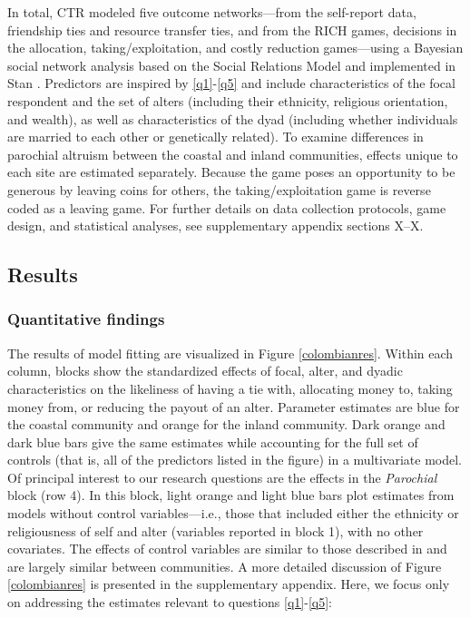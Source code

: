 \documentclass[bibauthoryear]{aa}
\begin{document}
In total, CTR modeled five outcome networks---from the self-report data, friendship ties and resource transfer ties, and from the RICH games, decisions in the allocation, taking/exploitation, and costly reduction games---using a Bayesian social network analysis based on the Social Relations Model \citep[SRM,][]{kenny1984social,  koster2019statistical} and implemented in Stan \citep{Rstan2017xx}. Predictors are inspired by \ref{q1}-\ref{q5} and include characteristics of the focal respondent and the set of alters (including their ethnicity, religious orientation, and wealth), as well as characteristics of the dyad (including whether individuals are married to each other or genetically related). To examine differences in parochial altruism between the coastal and inland communities, effects unique to each site are estimated separately. Because the game poses an opportunity to be generous by leaving coins for others, the taking/exploitation game is reverse coded as a leaving game. For further details on data collection protocols, game design, and statistical analyses, see supplementary appendix sections X--X.

\subsection{Results}
\subsubsection{Quantitative findings}
The results of model fitting are visualized in Figure \ref{colombianres}. Within each column, blocks show the standardized effects of focal, alter, and dyadic characteristics on the likeliness of having a tie with, allocating money to, taking money from, or reducing the payout of an alter. Parameter estimates are blue for the coastal community  and orange for the inland community. Dark orange and dark blue bars give the same estimates while accounting for the full set of controls (that is, all of the predictors listed in the figure) in a multivariate model. %
Of principal interest to our research questions  are the effects in the \emph{Parochial} block (row 4). In this block, light orange and light blue bars plot estimates from models without control variables---i.e., those that included either the ethnicity or religiousness of self and alter (variables reported in block 1), with no other covariates. The effects of control variables are similar to those described in \citet{Pisor2020} and are largely similar between communities. A more detailed discussion of Figure \ref{colombianres} is presented in the supplementary appendix. Here, we focus  only on addressing the estimates relevant to questions \ref{q1}-\ref{q5}:
\end{document}
